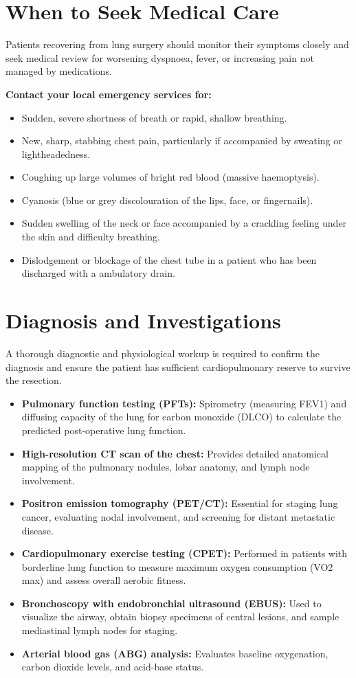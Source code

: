 \section*{When to Seek Medical Care}
Patients recovering from lung surgery should monitor their symptoms closely and seek medical review for worsening dyspnoea, fever, or increasing pain not managed by medications.

\textbf{Contact your local emergency services for:}
\begin{itemize}
    \item Sudden, severe shortness of breath or rapid, shallow breathing.
    \item New, sharp, stabbing chest pain, particularly if accompanied by sweating or lightheadedness.
    \item Coughing up large volumes of bright red blood (massive haemoptysis).
    \item Cyanosis (blue or grey discolouration of the lips, face, or fingernails).
    \item Sudden swelling of the neck or face accompanied by a crackling feeling under the skin and difficulty breathing.
    \item Dislodgement or blockage of the chest tube in a patient who has been discharged with a ambulatory drain.
\end{itemize}

\section*{Diagnosis and Investigations}
A thorough diagnostic and physiological workup is required to confirm the diagnosis and ensure the patient has sufficient cardiopulmonary reserve to survive the resection.
\begin{itemize}
    \item \textbf{Pulmonary function testing (PFTs):} Spirometry (measuring FEV1) and diffusing capacity of the lung for carbon monoxide (DLCO) to calculate the predicted post-operative lung function.
    \item \textbf{High-resolution CT scan of the chest:} Provides detailed anatomical mapping of the pulmonary nodules, lobar anatomy, and lymph node involvement.
    \item \textbf{Positron emission tomography (PET/CT):} Essential for staging lung cancer, evaluating nodal involvement, and screening for distant metastatic disease.
    \item \textbf{Cardiopulmonary exercise testing (CPET):} Performed in patients with borderline lung function to measure maximum oxygen consumption (VO2 max) and assess overall aerobic fitness.
    \item \textbf{Bronchoscopy with endobronchial ultrasound (EBUS):} Used to visualize the airway, obtain biopsy specimens of central lesions, and sample mediastinal lymph nodes for staging.
    \item \textbf{Arterial blood gas (ABG) analysis:} Evaluates baseline oxygenation, carbon dioxide levels, and acid-base status.
\end{itemize}

